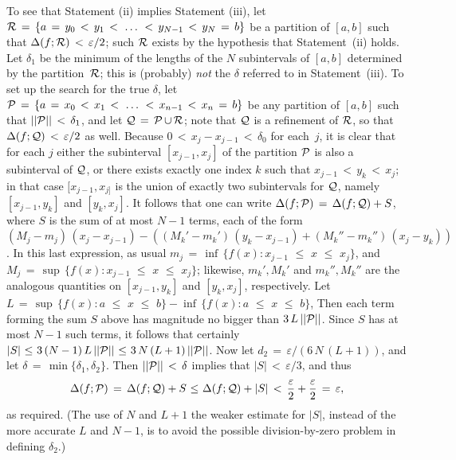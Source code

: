         To see that Statement (ii) implies Statement (iii), let ${\cal R} \,=\, \{a \,=\, y_{0}\,<\,y_{1}\,<\,\,{\ldots}\,\,<\,y_{N-1}\,<\,y_{N} \,=\, b\}$
    be a partition of $[a,b]$ such that ${\Delta}(f;{\cal R})\,<\,{\varepsilon}/2$; such ${\cal R}$ exists by the hypothesis that Statement~(ii) holds.
    Let ${\delta}_{1}$ be the minimum of the lengths of the $N$ subintervals of $[a,b]$ determined by the partition~${\cal R}$; this is (probably) {\em not} the ${\delta}$ referred to in Statement~(iii).
    To set up the search for the true ${\delta}$, let ${\cal P} \,=\, \{a \,=\, x_{0}\,<\,x_{1}\,<\,\,{\ldots}\,\,<\,x_{n-1}\,<\,x_{n} \,=\, b\}$ be any partition of $[a,b]$ such that $||{\cal P}||\,<\,{\delta}_{1}$, and let ${\cal Q} \,=\, {\cal P}\,{\cup}\,{\cal R}$;
    note that ${\cal Q}$ is a refinement of ${\cal R}$, so that ${\Delta}(f;{\cal Q})\,<\,{\varepsilon}/2$ as well.
    Because $0\,<\,x_{j}-x_{j-1}\,<\,{\delta}_{0}$ for each~$j$, it is clear that for each $j$ either the subinterval $[x_{j-1},x_{j}]$ of the partition ${\cal P}$ is also a subinterval of ${\cal Q}$,
    or there exists exactly one index $k$ such that $x_{j-1}\,<\,y_{k}\,<\,x_{j}$; in that case $[x_{j-1},x_{j]}$ is the union of exactly two subintervals for ${\cal Q}$,
    namely $[x_{j-1}, y_{k}]$ and $[y_{k},x_{j}]$. It follows that one can write ${\Delta}(f;{\cal P}) \,=\, {\Delta}(f;{\cal Q}) + S$,
    where $S$ is the sum of at most $N-1$ terms, each of the form $(M_{j}-m_{j})\,(x_{j}-x_{j-1}) - \left((M_{k}'-m_{k}')\,(y_{k}-x_{j-1}) + (M_{k}''-m_{k}'')\,(x_{j}-y_{k})\right)$.
    In this last expression, as usual $m_{j} \,=\, {\inf}\,\{f(x): x_{j-1}\,\,{\leq}\,\,x\,\,{\leq}\,\,x_{j}\}$, and $M_{j} \,=\, {\sup}\,\{f(x): x_{j-1}\,\,{\leq}\,\,x\,\,{\leq}\,\,x_{j}\}$;
    likewise, $m_{k}', M_{k}'$ and $m_{k}'', M_{k}''$ are the analogous quantities on $[x_{j-1},y_{k}]$ and $[y_{k},x_{j}]$, respectively.
    Let $L \,=\, {\sup}\,\{f(x): a\,\,{\leq}\,\,x\,\,{\leq}\,\,b\} - {\inf}\,\{f(x): a\,\,{\leq}\,\,x\,\,{\leq}\,\,b\}$,
    Then each term forming the sum $S$ above has magnitude no bigger than $3\,L\,||{\cal P}||$. Since $S$ has at most $N-1$ such terms, it follows that certainly $|S|\,\,{\leq}\,\,3\,(N-1)\,L\,||{\cal P}||\,\,{\leq}\,\,3\,N\,(L+1)\,||{\cal P}||$.
    Now let $d_{2} \,=\, {\varepsilon}/(6\,N\,(L+1))$, and let ${\delta} \,=\, \min\{{\delta}_{1}, {\delta}_{2}\}$.
    Then $||{\cal P}||\,<\,{\delta}$ implies that $|S|\,<\,{\varepsilon}/3$, and thus
        \begin{displaymath}
        {\Delta}(f;{\cal P}) \,=\, {\Delta}(f;{\cal Q}) + S\,\,{\leq}\,\,{\Delta}(f;{\cal Q}) + |S|
        \,<\, \frac{{\varepsilon}}{2} + \frac{{\varepsilon}}{2} \,=\, {\varepsilon},
        \end{displaymath}
    as required. (The use of $N$ and $L+1$ the weaker estimate for $|S|$, instead of the more accurate $L$ and $N-1$,
    is to avoid the possible division-by-zero problem in defining ${\delta}_{2}$.)

